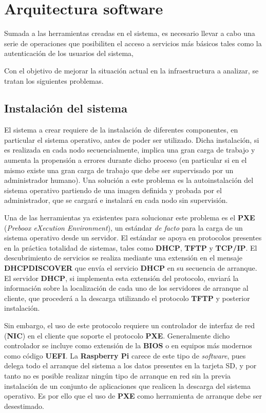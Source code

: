 \chapter{Arquitectura software}

Sumada a las herramientas creadas en el sistema, es necesario llevar a cabo una serie de operaciones que posibiliten el acceso a servicios más básicos tales como la autenticación de los usuarios del sistema, %

Con el objetivo de mejorar la situación actual en la infraestructura a analizar, se tratan los siguientes problemas.

\section{Instalación del sistema}

El sistema a crear requiere de la instalación de diferentes componentes, en particular el sistema operativo, antes de poder ser utilizado. Dicha instalación, si es realizada en cada nodo secuencialmente, implica una gran carga de trabajo y aumenta la propensión a errores durante dicho proceso (en particular si en el mismo existe una gran carga de trabajo que debe ser supervisado por un administrador humano). Una solución a este problema es la autoinstalación del sistema operativo partiendo de una imagen definida y probada por el administrador, que se cargará e instalará en cada nodo sin supervisión.

Una de las herramientas ya existentes para solucionar este problema es el \textbf{PXE} (\textit{Preboox eXecution Environment})\cite{pxeintel}, un estándar \textit{de facto}\cite{avramov:architecture} para la carga de un sistema operativo desde un servidor. El estándar se apoya en protocolos presentes en la práctica totalidad de sistemas, tales como \textbf{DHCP}, \textbf{TFTP} y \textbf{TCP/IP}. El descubrimiento de servicios se realiza mediante una extensión en el mensaje \textbf{DHCPDISCOVER} que envía el servicio \textbf{DHCP} en su secuencia de arranque\cite{rfc4578}. El servidor \textbf{DHCP}, si implementa esta extensión del protocolo, enviará la información sobre la localización de cada uno de los servidores de arranque al cliente, que procederá a la descarga utilizando el protocolo \textbf{TFTP} y posterior instalación\cite{pxeoverview}.

Sin embargo, el uso de este protocolo requiere un controlador de interfaz de red (\textbf{NIC}) en el cliente que soporte el protocolo \textbf{PXE}. Generalmente dicho controlador se incluye como extensión de la \textbf{BIOS} o en equipos más modernos como código \textbf{UEFI}. La \textbf{Raspberry Pi} carece de este tipo de \textit{software}, pues delega todo el arranque del sistema a los datos presentes en la tarjeta SD, y por tanto no es posible realizar ningún tipo de arranque en red sin la previa instalación de un conjunto de aplicaciones que realicen la descarga del sistema operativo. Es por ello que el uso de \textbf{PXE} como herramienta de arranque debe ser desestimado.

